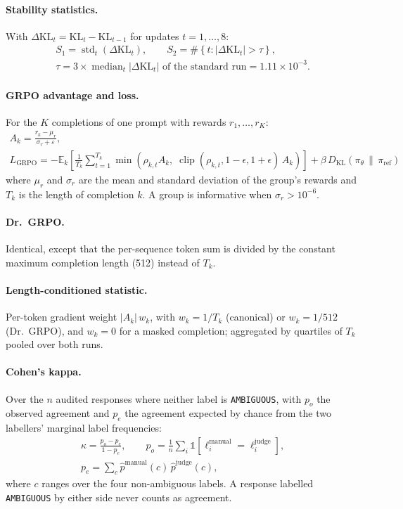 \documentclass{article}
\begin{document}
\paragraph{Stability statistics.}
With $\Delta\mathrm{KL}_t = \mathrm{KL}_t - \mathrm{KL}_{t-1}$ for updates $t = 1, \dots, 8$:
\begin{gather*}
S_1 = \operatorname{std}_t\left(\Delta\mathrm{KL}_t\right), \qquad
S_2 = \#\left\{t : |\Delta\mathrm{KL}_t| > \tau\right\}, \\
\tau = 3 \times \operatorname{median}_t |\Delta\mathrm{KL}_t| \text{ of the standard run} = 1.11\times10^{-3}.
\end{gather*}

\paragraph{GRPO advantage and loss.} For the $K$ completions of one prompt with rewards $r_1, \dots, r_K$:
\begin{gather*}
A_k = \frac{r_k - \mu_r}{\sigma_r + \varepsilon}, \\
L_{\text{GRPO}} = -\mathbb{E}_k\left[\frac{1}{T_k}\sum_{t=1}^{T_k}\min\left(\rho_{k,t} A_k,\; \operatorname{clip}(\rho_{k,t}, 1-\epsilon, 1+\epsilon)\, A_k\right)\right] + \beta\, D_{\mathrm{KL}}(\pi_\theta \,\|\, \pi_{\text{ref}})
\end{gather*}
where $\mu_r$ and $\sigma_r$ are the mean and standard deviation of the group's rewards and $T_k$ is the length of completion $k$. A group is informative when $\sigma_r > 10^{-6}$.

\paragraph{Dr.~GRPO.} Identical, except that the per-sequence token sum is divided by the constant maximum completion length (512) instead of $T_k$.

\paragraph{Length-conditioned statistic.} Per-token gradient weight $|A_k|\, w_k$, with $w_k = 1/T_k$ (canonical) or $w_k = 1/512$ (Dr.~GRPO), and $w_k = 0$ for a masked completion; aggregated by quartiles of $T_k$ pooled over both runs.

\paragraph{Cohen's kappa.} Over the $n$ audited responses where neither label is \texttt{AMBIGUOUS}, with $p_o$ the observed agreement and $p_e$ the agreement expected by chance from the two labellers' marginal label frequencies:
\begin{gather*}
\kappa = \frac{p_o - p_e}{1 - p_e}, \qquad
p_o = \frac{1}{n}\sum_{i} \mathbb{1}[\ell^{\text{manual}}_i = \ell^{\text{judge}}_i], \\
p_e = \sum_{c} \hat{p}^{\text{manual}}(c)\, \hat{p}^{\text{judge}}(c),
\end{gather*}
where $c$ ranges over the four non-ambiguous labels. A response labelled \texttt{AMBIGUOUS} by either side never counts as agreement.
\end{document}
